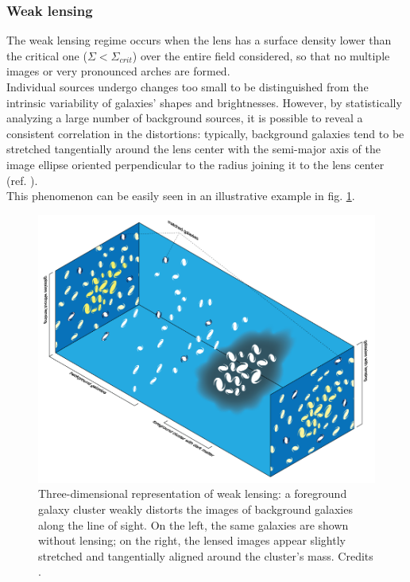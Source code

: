 \subsubsection{Weak lensing}
The weak lensing regime occurs when the lens has a surface density lower than the critical one ($\Sigma < \Sigma_{crit}$) over the entire field considered, so that no multiple images or very pronounced arches are formed.\\ Individual sources undergo changes too small to be distinguished from the intrinsic variability of galaxies' shapes and brightnesses. However, by statistically analyzing a large number of background sources, it is possible to reveal a consistent correlation in the distortions: typically, background galaxies tend to be stretched tangentially around the lens center with the semi-major axis of the image ellipse oriented perpendicular to the radius joining it to the lens center (ref. \cite{2024darkmatter}).\\ This phenomenon can be easily seen in an illustrative example in fig. \ref{fig:weak lensing}.
\begin{figure}[h!]
    \centering
    \includegraphics[width=0.5\linewidth]{Images/Chapter3/Gravitational-weak-lensing-3d.png}
    \caption[Weak lensing]{Three-dimensional representation of weak lensing: a foreground galaxy cluster weakly distorts the images of background galaxies along the line of sight. On the left, the same galaxies are shown without lensing; on the right, the lensed images appear slightly stretched and tangentially aligned around the cluster's mass. Credits \cite{Sachs2008WeakLensing3D}.}
    \label{fig:weak lensing}
\end{figure}

